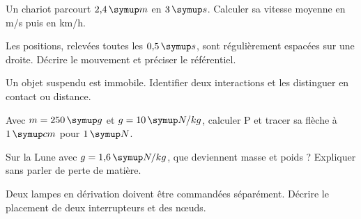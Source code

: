 \pcGrille{}
\label{sujet-B2}
\par\noindent\begin{minipage}{\linewidth}
Un chariot parcourt $2{,}4\unite m$ en $3\unite s$. Calculer sa vitesse moyenne en m/s puis en km/h.\par
\end{minipage}\par
\par\noindent\begin{minipage}{\linewidth}
Les positions, relevées toutes les $0{,}5\unite s$, sont régulièrement espacées sur une droite. Décrire le mouvement et préciser le référentiel.\par
\end{minipage}\par
\par\noindent\begin{minipage}{\linewidth}
Un objet suspendu est immobile. Identifier deux interactions et les distinguer en contact ou distance.\par
\end{minipage}\par
\par\noindent\begin{minipage}{\linewidth}
Avec $m=250\unite g$ et $g=10\unite{N/kg}$, calculer P et tracer sa flèche à $1\unite{cm}$ pour $1\unite N$.\par
\end{minipage}\par
\par\noindent\begin{minipage}{\linewidth}
Sur la Lune avec $g=1{,}6\unite{N/kg}$, que deviennent masse et poids ? Expliquer sans parler de perte de matière.\par
\end{minipage}\par
{}\pcGrille{}
\label{sujet-B3}
\par\noindent\begin{minipage}{\linewidth}
Deux lampes en dérivation doivent être commandées séparément. Décrire le placement de deux interrupteurs et des nœuds.\par
{}
\end{minipage}\par
